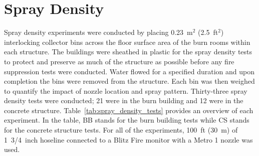 \documentclass[12pt,oneside]{book}
\begin{document}

\section{Spray Density}
\label{sec:Spray_Density}

Spray density experiments were conducted by placing 0.23~m$^2$ (2.5~ft$^2$) interlocking collector bins across the floor surface area of the burn rooms within each structure. The buildings were sheathed in plastic for the spray density tests to protect and preserve as much of the structure as possible before any fire suppression tests were conducted. Water flowed for a specified duration and upon completion the bins were removed from the structure. Each bin was then weighed to quantify the impact of nozzle location and spray pattern. Thirty-three spray density tests were conducted; 21 were in the burn building and 12 were in the concrete structure. Table~\ref{tab:spray_density_tests} provides an overview of each experiment. In the table, BB stands for the burn building tests while CS stands for the concrete structure tests. For all of the experiments, 100~ft (30~m) of 1~3/4~inch hoseline connected to a Blitz Fire monitor with a Metro 1 nozzle was used.
\end{document}
